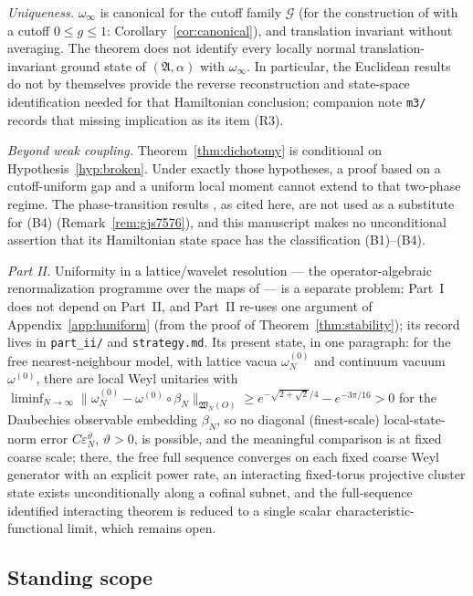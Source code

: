 \documentclass[11pt,a4paper]{article}
\theoremstyle{plain}
\theoremstyle{definition}
\theoremstyle{plain}
\theoremstyle{definition}
\newcommand{\A}{\mathfrak{A}}
\newcommand{\G}{\mathcal{G}}
\begin{document}
\emph{Uniqueness.} $\omega_\infty$ is canonical for the cutoff family $\G$ (for the
construction of \cite{GJ3} with a cutoff $0\le g\le1$: Corollary~\ref{cor:canonical}), and
translation invariant without averaging. The theorem
does not identify every locally normal translation-invariant ground state of
$(\A,\alpha)$ with $\omega_\infty$. In particular, the Euclidean results \cite{AHZ,BDW}
do not by themselves provide the reverse reconstruction and state-space identification
needed for that Hamiltonian conclusion; companion note \texttt{m3/} records that missing
implication as its item (R3).

\emph{Beyond weak coupling.} Theorem~\ref{thm:dichotomy} is conditional on
Hypothesis~\ref{hyp:broken}. Under exactly those hypotheses, a proof based on a
cutoff-uniform gap and a uniform local moment cannot extend to that two-phase regime. The phase-transition results
\cite{GJS75,GJS76}, as cited here, are not used as a substitute for (B4)
(Remark~\ref{rem:gjs7576}), and this manuscript makes no unconditional assertion that its
Hamiltonian state space has the classification (B1)--(B4).

\emph{Part II.} Uniformity in a lattice/wavelet resolution --- the operator-algebraic
renormalization programme over the maps of \cite{MMST} --- is a separate problem: Part~I does
not depend on Part~II, and Part~II re-uses one argument of Appendix~\ref{app:huniform} (from the
proof of Theorem~\ref{thm:stability}); its record lives in
\texttt{part\_ii/} and \texttt{strategy.md}. Its present state, in one paragraph: for the
free nearest-neighbour model, with lattice vacua $\omega^{(0)}_N$ and continuum vacuum
$\omega^{(0)}$, there are local Weyl unitaries with
$\liminf_{N\to\infty}\|\omega^{(0)}_N-\omega^{(0)}\circ\beta_N\|_{\mathfrak W_N(O)}
\ge e^{-\sqrt{2+\sqrt2}/4}-e^{-3\pi/16}>0$ for the Daubechies observable embedding
$\beta_N$, so no diagonal (finest-scale) local-state-norm error
$C\varepsilon_N^{\vartheta}$, $\vartheta>0$, is possible, and the meaningful comparison
is at fixed coarse scale; there, the free full sequence converges on each fixed coarse
Weyl generator with an explicit power rate, an interacting fixed-torus projective cluster
state exists unconditionally along a cofinal subnet, and the full-sequence identified
interacting theorem is reduced to a single scalar characteristic-functional limit, which
remains open.

\subsection*{Standing scope}
\end{document}

